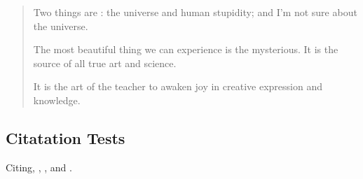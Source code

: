 \documentclass[manuscript]{stjour}
\begin{document}
\begin{quotation}
Two things are : the universe and
human stupidity;  and I'm not sure about the universe.

The most beautiful thing we can experience is the mysterious. It is
the source of all true art and science. 

It is the  art of the teacher to awaken joy in creative
expression and knowledge.
\end{quotation}
\subsection{Citatation Tests}
Citing, \citet{anderson}, \citep{anderson}, and \cite{anderson}.

\nocite{*}

\end{document}
